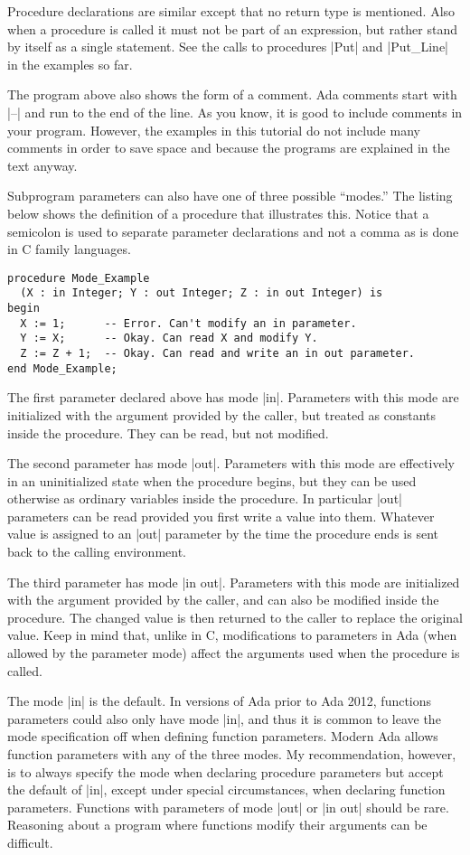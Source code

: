 Procedure declarations are similar except that no return type is mentioned. Also when a
procedure is called it must not be part of an expression, but rather stand by itself as a single
statement. See the calls to procedures |Put| and |Put_Line| in the examples so far.

The program above also shows the form of a comment. Ada comments start with |--| and run to the
end of the line. As you know, it is good to include comments in your program. However, the
examples in this tutorial do not include many comments in order to save space and because the
programs are explained in the text anyway.

Subprogram parameters can also have one of three possible ``modes.'' The listing below shows the
definition of a procedure that illustrates this. Notice that a semicolon is used to separate
parameter declarations and not a comma as is done in C family languages.

\begin{lstlisting}
procedure Mode_Example
  (X : in Integer; Y : out Integer; Z : in out Integer) is
begin
  X := 1;      -- Error. Can't modify an in parameter.
  Y := X;      -- Okay. Can read X and modify Y.
  Z := Z + 1;  -- Okay. Can read and write an in out parameter.
end Mode_Example;
\end{lstlisting}

The first parameter declared above has mode |in|. Parameters with this mode are initialized with
the argument provided by the caller, but treated as constants inside the procedure. They can be
read, but not modified.

The second parameter has mode |out|. Parameters with this mode are effectively in an
uninitialized state when the procedure begins, but they can be used otherwise as ordinary
variables inside the procedure. In particular |out| parameters can be read provided you first
write a value into them. Whatever value is assigned to an |out| parameter by the time the
procedure ends is sent back to the calling environment.

The third parameter has mode |in out|. Parameters with this mode are initialized with the
argument provided by the caller, and can also be modified inside the procedure. The changed
value is then returned to the caller to replace the original value. Keep in mind that, unlike in
C, modifications to parameters in Ada (when allowed by the parameter mode) affect the arguments
used when the procedure is called.

The mode |in| is the default. In versions of Ada prior to Ada 2012, functions parameters could
also only have mode |in|, and thus it is common to leave the mode specification off when
defining function parameters. Modern Ada allows function parameters with any of the three modes.
My recommendation, however, is to always specify the mode when declaring procedure parameters
but accept the default of |in|, except under special circumstances, when declaring function
parameters. Functions with parameters of mode |out| or |in out| should be rare. Reasoning about
a program where functions modify their arguments can be difficult.

